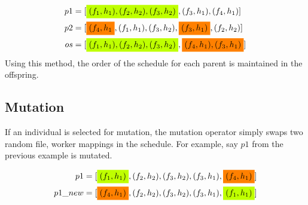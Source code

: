 \begin{align}
 p1 & = [\mathcolorbox{lime}{(f_1, h_1), (f_2, h_2), (f_3, h_2)}, (f_3, h_1), (f_4, h_1)] \nonumber \\
 p2 & = [\mathcolorbox{orange}{(f_4, h_1}, (f_1, h_1),(f_3, h_2), \mathcolorbox{orange}{(f_3, h_1)}, (f_2, h_2)] \nonumber \\
 os & = [\mathcolorbox{lime}{(f_1, h_1), (f_2, h_2), (f_3, h_2)}, \mathcolorbox{orange}{(f_4, h_1), (f_3, h_1)}] \nonumber
\end{align}
Using this method, the order of the schedule for each parent is maintained in the offspring.

\subsection*{Mutation}
If an individual is selected for mutation, the mutation operator simply swaps
two random file, worker mappings in the schedule. For example, say $p1$ from
the previous example is mutated.

\begin{align}
 p1 & = [\mathcolorbox{lime}{(f_1, h_1)}, (f_2, h_2), (f_3, h_2), (f_3, h_1), \mathcolorbox{orange}{(f_4, h_1)}] \nonumber \\
 p1\_new & = [\mathcolorbox{orange}{(f_4, h_1)}, (f_2, h_2), (f_3, h_2), (f_3, h_1),\mathcolorbox{lime}{(f_1, h_1)}] \nonumber
\end{align}
